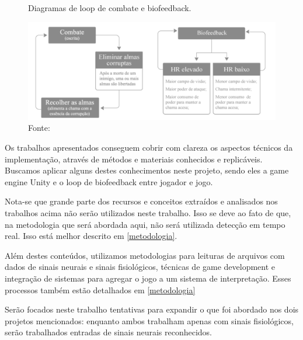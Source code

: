 \begin{figure}[h]
    \centering
    \caption{Diagramas de loop de combate e biofeedback.}
    \includegraphics[width=17cm]{Figuras/diagrama-filipa-loop.png}
    \caption*{Fonte: \cite{filipa2019emovere}}
    \label{fig:diagrama_biofeedback}
\end{figure}

Os trabalhos apresentados conseguem cobrir com clareza os aspectos técnicos da implementação, através de métodos e materiais conhecidos e replicáveis. Buscamos aplicar alguns destes conhecimentos neste projeto, sendo eles a game engine Unity e o loop de biofeedback entre jogador e jogo.

Nota-se que grande parte dos recursos e conceitos extraídos e analisados nos trabalhos acima não serão utilizados neste trabalho. Isso se deve ao fato de que, na metodologia que será abordada aqui, não será utilizada detecção em tempo real. Isso está melhor descrito em \ref{metodologia}.

Além destes conteúdos, utilizamos metodologias para leituras de arquivos com dados de sinais neurais e sinais fisiológicos, técnicas de game development e integração de sistemas para agregar o jogo a um sistema de interpretação. Esses processos também estão detalhados em \ref{metodologia} 

Serão focados neste trabalho tentativas para expandir o que foi abordado nos dois projetos mencionados: enquanto ambos trabalham apenas com sinais fisiológicos, serão trabalhados entradas de sinais neurais reconhecidos.